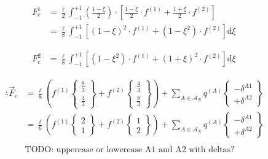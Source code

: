 \begin{equation}\label{Feass4}
\begin{aligned}
F_e^1 &= \frac{\ell}{2} \int_{-1}^{+1} \left(\frac{1-\xi}{2}\right) \cdot \left[
	\frac{1-\xi}{2}\cdot f^{(1)}
	+ \frac{1+\xi}{2}\cdot f^{(2)}
\right] \\
&= \frac{\ell}{8} \int_{-1}^{+1} \left[
	\left(1-\xi\right)^2\cdot f^{(1)}
	+ \left(1-\xi^2\right)\cdot f^{(2)}
\right] \text{d} \xi
\end{aligned}
\end{equation}

\begin{equation}\label{Feass5}
\begin{aligned}
F_e^2 &= \frac{\ell}{8} \int_{-1}^{+1} \left[
	(1-\xi^2)\cdot f^{(1)} + (1+\xi)^2\cdot f^{(2)}
\right] \text{d}\xi
\end{aligned}
\end{equation}


\begin{equation}\label{Feass6}
\begin{aligned}
\therefore \vec{F}_e &= \frac{\ell}{8} \left(
	f^{(1)} \begin{Bmatrix} \frac{8}{3} \\ \frac{4}{3} \end{Bmatrix}
	+ f^{(2)} \begin{Bmatrix} \frac{4}{3} \\ \frac{8}{3} \end{Bmatrix}
\right)
+ \sum_{A \in \mathcal{A}_N} q^{(A)} \begin{Bmatrix} -\delta^{A1} \\ +\delta^{A2} \end{Bmatrix} \\
&= \frac{\ell}{6} \left(
	f^{(1)} \begin{Bmatrix} 2 \\ 1 \end{Bmatrix}
	+ f^{(2)} \begin{Bmatrix} 1 \\ 2 \end{Bmatrix}
\right)
+ \sum_{A \in \mathcal{A}_N} q^{(A)} \begin{Bmatrix} -\delta^{A1} \\ +\delta^{A2} \end{Bmatrix} \\\\
& \text{TODO:  uppercase or lowercase A1 and A2 with deltas?}
\end{aligned}
\end{equation}


